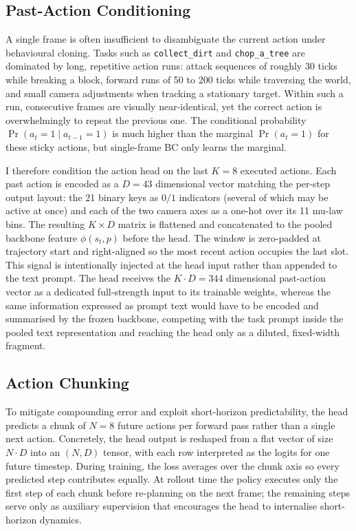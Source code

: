 \subsection{Past-Action Conditioning} \label{past_action}
A single frame is often insufficient to disambiguate the current action under
behavioural cloning. Tasks such as \texttt{collect\_dirt} and
\texttt{chop\_a\_tree} are dominated by long, repetitive action runs:
attack sequences of roughly 30 ticks while breaking a block, forward runs of
50 to 200 ticks while traversing the world, and small camera adjustments when
tracking a stationary target. Within such a run, consecutive frames are
visually near-identical, yet the correct action is overwhelmingly to repeat
the previous one. The conditional probability $\Pr(a_t = 1 \mid a_{t-1} = 1)$
is much higher than the marginal $\Pr(a_t = 1)$ for these sticky actions, but
single-frame BC only learns the marginal.

I therefore condition the action head on the last $K = 8$ executed actions.
Each past action is encoded as a $D = 43$ dimensional vector matching the
per-step output layout: the 21 binary keys as $0/1$ indicators (several of
which may be active at once) and each of the two camera axes as a one-hot
over its 11 mu-law bins. The resulting $K \times D$ matrix is flattened and
concatenated to the pooled backbone feature $\phi(s_t, p)$ before the head.
The window is zero-padded at trajectory start and right-aligned so the most
recent action occupies the last slot. This signal is intentionally injected
at the head input rather than appended to the text prompt. The head receives
the $K \cdot D = 344$ dimensional past-action vector as a dedicated
full-strength input to its trainable weights, whereas the same information
expressed as prompt text would have to be encoded and summarised by the
frozen backbone, competing with the task prompt inside the pooled text
representation and reaching the head only as a diluted, fixed-width fragment.

\subsection{Action Chunking} \label{chunking}
To mitigate compounding error and exploit short-horizon predictability, the
head predicts a chunk of $N = 8$ future actions per forward pass rather than
a single next action. Concretely, the head output is reshaped from a flat
vector of size $N \cdot D$ into an $(N, D)$ tensor, with each row interpreted
as the logits for one future timestep. During training, the loss averages
over the chunk axis so every predicted step contributes equally. At rollout
time the policy executes only the first step of each chunk before re-planning
on the next frame; the remaining steps serve only as auxiliary supervision
that encourages the head to internalise short-horizon dynamics.

